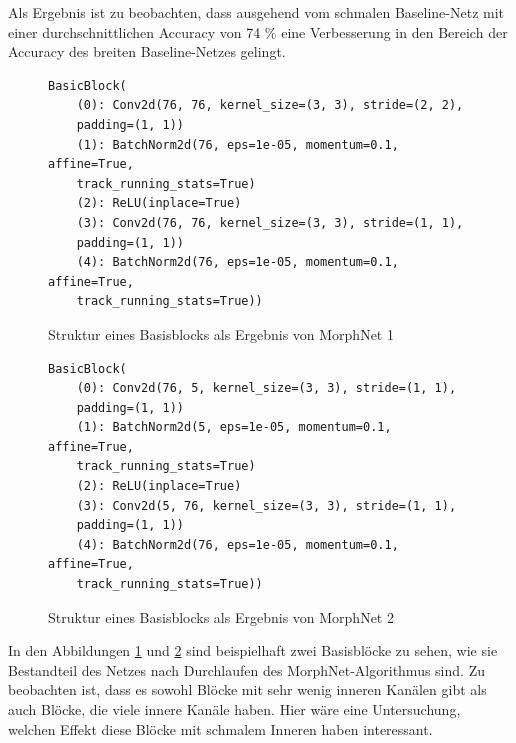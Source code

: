 Als Ergebnis ist zu beobachten, dass ausgehend vom schmalen Baseline-Netz mit einer durchschnittlichen Accuracy von 74 \% eine Verbesserung in den Bereich der Accuracy des breiten Baseline-Netzes gelingt.  
\begin{figure}
\begin{verbatim}
BasicBlock(
    (0): Conv2d(76, 76, kernel_size=(3, 3), stride=(2, 2),
    padding=(1, 1))
    (1): BatchNorm2d(76, eps=1e-05, momentum=0.1, affine=True,
    track_running_stats=True)
    (2): ReLU(inplace=True)
    (3): Conv2d(76, 76, kernel_size=(3, 3), stride=(1, 1), 
    padding=(1, 1))
    (4): BatchNorm2d(76, eps=1e-05, momentum=0.1, affine=True, 
    track_running_stats=True))
\end{verbatim}
\caption{Struktur eines Basisblocks als Ergebnis von MorphNet 1}
\label{abb:verb1}
\end{figure}
\begin{figure}
\begin{verbatim}   
BasicBlock(
    (0): Conv2d(76, 5, kernel_size=(3, 3), stride=(1, 1), 
    padding=(1, 1))
    (1): BatchNorm2d(5, eps=1e-05, momentum=0.1, affine=True, 
    track_running_stats=True)
    (2): ReLU(inplace=True)
    (3): Conv2d(5, 76, kernel_size=(3, 3), stride=(1, 1), 
    padding=(1, 1))
    (4): BatchNorm2d(76, eps=1e-05, momentum=0.1, affine=True, 
    track_running_stats=True))
\end{verbatim}
\caption{Struktur eines Basisblocks als Ergebnis von MorphNet 2}
\label{abb:verb2}
\end{figure}

In den Abbildungen \ref{abb:verb1} und \ref{abb:verb2} sind beispielhaft zwei Basisblöcke zu sehen, wie sie Bestandteil des Netzes nach Durchlaufen des MorphNet-Algorithmus sind. Zu beobachten ist, dass es sowohl Blöcke mit sehr wenig inneren Kanälen gibt als auch Blöcke, die viele innere Kanäle haben. Hier wäre eine Untersuchung, welchen Effekt diese Blöcke mit schmalem Inneren haben interessant.

